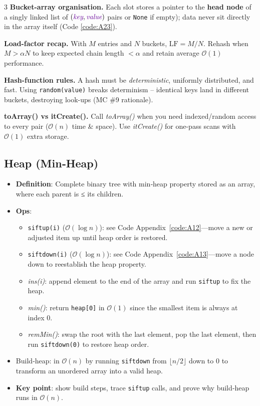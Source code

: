 \documentclass[6pt,landscape]{article}
\newcommand{\bigO}[1]{\ensuremath{\mathcal{O}(#1)}}
\newcommand{\keyword}[1]{\textbf{\textcolor{keywordcolor}{#1}}}
\newcommand{\var}[1]{\emph{\textcolor{varcolor}{#1}}}
\newcommand{\op}[1]{\textit{\textcolor{opcolor}{#1}}}
\begin{document}
\begin{multicols}{3}
\textbf{Bucket-array organisation.} Each slot stores a pointer to the \keyword{head node} of a singly linked list of \((\var{key},\var{value})\) pairs or \texttt{None} if empty); data never sit directly in the array itself (Code \ref{code:A23}).

\textbf{Load-factor recap.}
With \(M\) entries and \(N\) buckets, \(\text{LF}=M/N\).
Rehash when \(M>\alpha N\) to keep expected chain length \(<\alpha\) and retain
average \bigO{1} performance.

\textbf{Hash-function rules.}
A hash must be \emph{deterministic}, uniformly distributed, and fast.
Using \texttt{random(value)} breaks determinism – identical keys land in
different buckets, destroying look-ups (MC \#9 rationale).

\textbf{toArray() vs itCreate().}
Call \op{toArray()} when you need indexed/random access to every pair
(\bigO{n} time \& space).  
Use \op{itCreate()} for one-pass scans with \bigO{1} extra storage.


\subsection{Heap (Min‐Heap)}\label{sec:heap}
\begin{itemize}
  \item \keyword{Definition}: Complete binary tree with min‐heap property stored as an array, where each parent is ≤ its children.
  \item \textbf{Ops}:
    \begin{itemize}
      \item \texttt{siftup(i)} (\bigO{\log n}): see Code Appendix~\ref{code:A12}—move a new or adjusted item up until heap order is restored.
      \item \texttt{siftdown(i)} (\bigO{\log n}): see Code Appendix~\ref{code:A13}—move a node down to reestablish the heap property.
      \item \op{ins(i)}: append element to the end of the array and run \texttt{siftup} to fix the heap.
      \item \op{min()}: return \texttt{heap[0]} in \bigO{1} since the smallest item is always at index 0.
      \item \op{remMin()}: swap the root with the last element, pop the last element, then run \texttt{siftdown(0)} to restore heap order.
    \end{itemize}
  \item Build‐heap: in \bigO{n} by running \texttt{siftdown} from \(\lfloor n/2\rfloor\) down to 0 to transform an unordered array into a valid heap.
  \item \textbf{Key point}: show build steps, trace \texttt{siftup} calls, and prove why build‐heap runs in \bigO{n}.
\end{itemize}


\end{multicols}
\end{document}
